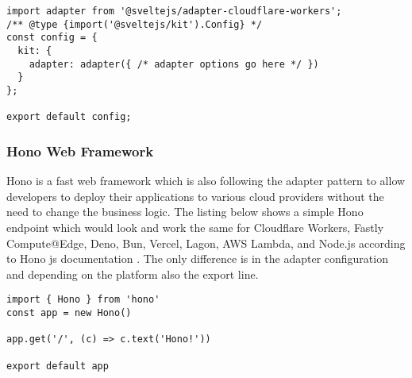 \begin{lstlisting}[frame=lines, style=ES6, caption={svelte.config.js SvelteKit adapter configuration}, showstringspaces=false, captionpos=b,]
import adapter from '@sveltejs/adapter-cloudflare-workers';
/** @type {import('@sveltejs/kit').Config} */
const config = {
  kit: {
    adapter: adapter({ /* adapter options go here */ })
  }
};
 
export default config;
\end{lstlisting}

\subsubsection{Hono Web Framework}

Hono \cite{honocommunity_2023_hono} is a fast web framework which is also following the adapter pattern to allow developers to deploy their applications to various cloud providers without the need to change the business logic. The listing below shows a simple Hono endpoint which would look and work the same for Cloudflare Workers, Fastly Compute@Edge, Deno, Bun, Vercel, Lagon, AWS Lambda, and Node.js according to Hono js documentation \cite{honocommunity_2023_hono}. The only difference is in the adapter configuration and depending on the platform also the export line. 

\begin{lstlisting}[frame=lines, style=ES6, caption={Standard Hono Handler function}, showstringspaces=false, captionpos=b,]
import { Hono } from 'hono'
const app = new Hono()

app.get('/', (c) => c.text('Hono!'))

export default app
\end{lstlisting}
